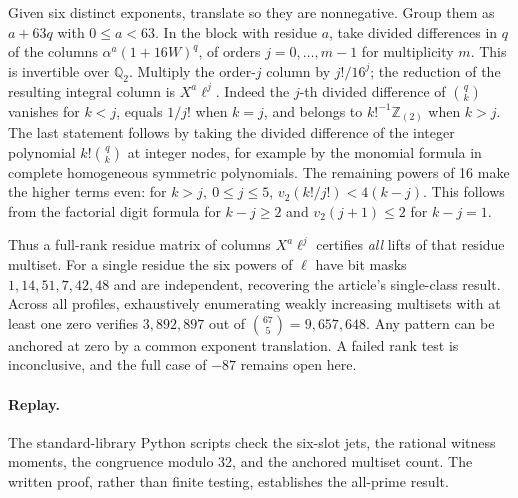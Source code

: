 \documentclass[11pt]{article}
\begin{document}
Given six distinct exponents, translate so they are nonnegative.
Group them as \(a+63q\) with \(0\le a<63\).
In the block with residue \(a\), take divided differences in \(q\)
of the columns \(\alpha^a(1+16W)^q\), of orders \(j=0,\dots,m-1\)
for multiplicity \(m\). This is invertible over \(\mathbb Q_2\).
Multiply the order-\(j\) column by \(j!/16^j\); the reduction
of the resulting integral column is \(X^a\ell^j\).
Indeed the \(j\)-th divided difference of \(\binom{q}{k}\) vanishes
for \(k<j\), equals \(1/j!\) when \(k=j\), and belongs to
\(k!^{-1}\mathbb Z_{(2)}\) when \(k>j\). The last statement follows
by taking the divided difference of the integer polynomial
\(k!\binom{q}{k}\) at integer nodes, for example by the monomial
formula in complete homogeneous symmetric polynomials.
The remaining powers of 16 make the higher terms even:
for \(k>j,\ 0\le j\le5\),
\(v_2(k!/j!)<4(k-j)\). This follows from the factorial digit
formula for \(k-j\ge2\) and \(v_2(j+1)\le2\) for \(k-j=1\).

Thus a full-rank residue matrix of columns \(X^a\ell^j\)
certifies \emph{all} lifts of that residue multiset. For a single
residue the six powers of \(\ell\) have bit masks
\(1,14,51,7,42,48\) and are independent, recovering the article's
single-class result. Across all profiles, exhaustively enumerating
weakly increasing multisets with at least one zero verifies
\(3{,}892{,}897\) out of \(\binom{67}{5}=9{,}657{,}648\).
Any pattern can be anchored at zero by a common exponent
translation. A failed rank test is inconclusive, and the full
case of \(-87\) remains open here.

\paragraph{Replay.}
The standard-library Python scripts check the six-slot jets,
the rational witness moments, the congruence modulo 32, and
the anchored multiset count. The written proof, rather than
finite testing, establishes the all-prime result.
\end{document}
